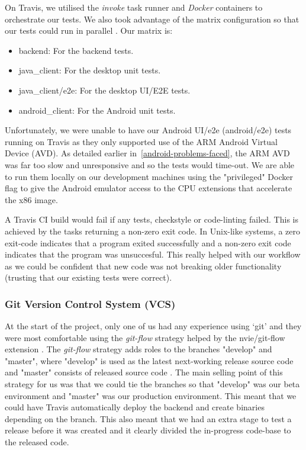 \documentclass[11pt,a4paper]{report}
\begin{document}
On Travis, we utilised the \emph{invoke} task runner and \emph{Docker} containers to orchestrate our tests. We also took advantage of the matrix configuration so that our tests could run in parallel \cite{website:travis_parallel}. Our matrix is:

\begin{itemize}
  \item backend: For the backend tests.
  \item java\_client: For the desktop unit tests.
  \item java\_client/e2e: For the desktop UI/E2E tests.
  \item android\_client: For the Android unit tests.
\end{itemize}

Unfortunately, we were unable to have our Android UI/e2e (android/e2e) tests running on Travis as they only supported use of the ARM Android Virtual Device (AVD). As detailed earlier in~\ref{android-problems-faced}, the ARM AVD was far too slow and unresponsive and so the tests would time-out. We are able to run them locally on our development machines using the "privileged" Docker flag to give the Android emulator access to the CPU extensions that accelerate the x86 image.

A Travis CI build would fail if any tests, checkstyle or code-linting failed. This is achieved by the tasks returning a non-zero exit code. In Unix-like systems, a zero exit-code indicates that a program exited successfully and a non-zero exit code indicates that the program was unsuccesful. This really helped with our workflow as we could be confident that new code was not breaking older functionality (trusting that our existing tests were correct).

\subsubsection{Git Version Control System (VCS)}

At the start of the project, only one of us had any experience using `git' and they were most comfortable using the \emph{git-flow} strategy helped by the nvie/git-flow extension \cite{website:github_nvie_git_flow}. The \emph{git-flow} strategy adds roles to the branches "develop" and "master", where "develop" is used as the latest next-working release source code and "master" consists of released source code \cite{website:git_flow}. The main selling point of this strategy for us was that we could tie the branches so that "develop" was our beta environment and "master" was our production environment. This meant that we could have Travis automatically deploy the backend and create binaries depending on the branch. This also meant that we had an extra stage to test a release before it was created and it clearly divided the in-progress code-base to the released code.
\end{document}
